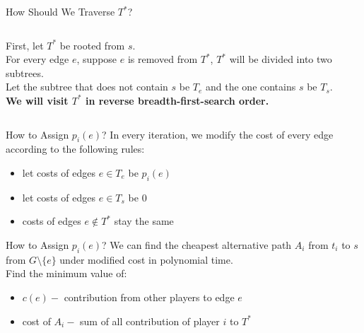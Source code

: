 \documentclass[11pt,aspectratio=169]{beamer}
\begin{document}
\begin{frame}{How Should We Traverse $T^*$?}
\begin{columns}
    First, let \(T^*\) be rooted from \(s\). \\
    \vspace{10pt}
    For every edge \(e\), suppose \(e\) is removed from \(T^*\), \(T^*\) will be divided into two subtrees.\\
    \vspace{10pt}
    Let the subtree that does not contain \(s\) be \(T_e\) and the one contains \(s\) be \(T_s\).\\
    \vspace{10pt}
    \textbf{We will visit \(T^*\) in reverse breadth-first-search order.\\}
\end{columns}
\end{frame}

\begin{frame}{How to Assign \(p_i(e)\)?}
In every iteration, we modify the cost of every edge according to the following rules:
\begin{itemize}
	\item let costs of edges \(e \in T_e\) be \(p_i(e)\)
	\item let costs of edges \(e \in T_s\) be  0
	\item costs of edges \(e\notin T^*\) stay the same
\end{itemize}
\vspace{10pt}
\end{frame}

\begin{frame}{How to Assign \(p_i(e)\)?}
    We can find the cheapest alternative path \(A_i\) from \(t_i\) to \(s\) from \(G \setminus \{e\}\) under modified cost in polynomial time. \\
    \vspace{10pt}
    Find the minimum value of:
    \begin{itemize}
        \item $c(e) - $ contribution from other players to edge \(e\)
        \item cost of \(A_i-\) sum of all contribution of player \(i\) to \(T^*\) 
    \end{itemize}
\end{frame}
\end{document}
